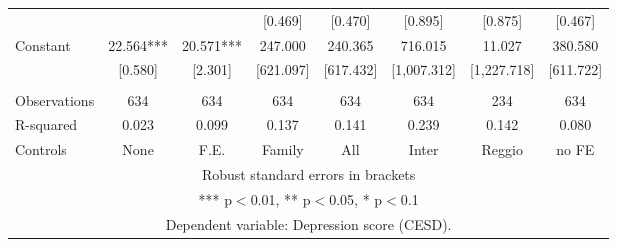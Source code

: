 \begin{tabular}{lccccccc}
 &  &  & [0.469] & [0.470] & [0.895] & [0.875] & [0.467] \\
Constant & 22.564*** & 20.571*** & 247.000 & 240.365 & 716.015 & 11.027 & 380.580 \\
 & [0.580] & [2.301] & [621.097] & [617.432] & [1,007.312] & [1,227.718] & [611.722] \\
 &  &  &  &  &  &  &  \\
Observations & 634 & 634 & 634 & 634 & 634 & 234 & 634 \\
R-squared & 0.023 & 0.099 & 0.137 & 0.141 & 0.239 & 0.142 & 0.080 \\
 Controls & None & F.E. & Family & All & Inter & Reggio & no FE \\ \hline
\multicolumn{8}{c}{ Robust standard errors in brackets} \\
\multicolumn{8}{c}{ *** p$<$0.01, ** p$<$0.05, * p$<$0.1} \\
\multicolumn{8}{c}{ Dependent variable: Depression score (CESD).} \\
\end{tabular}
